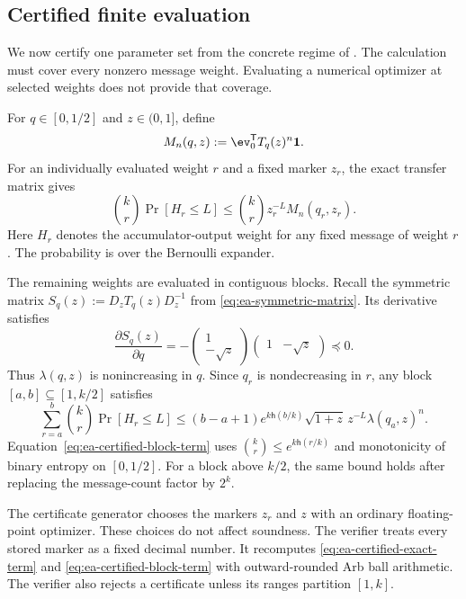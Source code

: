 \subsection{Certified finite evaluation}
\label{sec:ea-finite-certificate}

We now certify one parameter set from the concrete regime of \cite{EA}.  The
calculation must cover every nonzero message weight.  Evaluating a numerical
optimizer at selected weights does not provide that coverage.

For $q\in[0,1/2]$ and $z\in(0,1]$, define
\begin{equation}
 M_n(q,z):=\ev_0^{\mathsf T}T_q(z)^n\boldsymbol{1}.
 \label{eq:ea-exact-mgf}
\end{equation}
For an individually evaluated weight $r$ and a fixed marker $z_r$, the exact
transfer matrix gives
\begin{equation}
 \binom{k}{r}\Pr[H_r\leq L]
 \leq\binom{k}{r}z_r^{-L}M_n(q_r,z_r).
 \label{eq:ea-certified-exact-term}
\end{equation}
Here $H_r$ denotes the accumulator-output weight for any fixed message of
weight $r$.  The probability is over the Bernoulli expander.

The remaining weights are evaluated in contiguous blocks.  Recall the
symmetric matrix $S_q(z):=D_zT_q(z)D_z^{-1}$ from
\eqref{eq:ea-symmetric-matrix}.  Its derivative satisfies
\begin{equation}
 \frac{\partial S_q(z)}{\partial q}
 =-
 \begin{pmatrix}1\\-\sqrt z\end{pmatrix}
 \begin{pmatrix}1&-\sqrt z\end{pmatrix}
 \preceq0.
 \label{eq:ea-spectral-monotonicity}
\end{equation}
Thus $\lambda(q,z)$ is nonincreasing in $q$.  Since $q_r$ is nondecreasing in
$r$, any block $[a,b]\subseteq[1,k/2]$ satisfies
\begin{equation}
 \sum_{r=a}^{b}\binom{k}{r}\Pr[H_r\leq L]
 \leq
 (b-a+1)e^{k\mathsf{h}(b/k)}
 \sqrt{1+z}\,z^{-L}\lambda(q_a,z)^n.
 \label{eq:ea-certified-block-term}
\end{equation}
Equation~\eqref{eq:ea-certified-block-term} uses
$\binom{k}{r}\leq e^{k\mathsf{h}(r/k)}$ and monotonicity of binary entropy on
$[0,1/2]$.  For a block above $k/2$, the same bound holds after replacing the
message-count factor by $2^k$.

The certificate generator chooses the markers $z_r$ and $z$ with an ordinary
floating-point optimizer.  These choices do not affect soundness.  The
verifier treats every stored marker as a fixed decimal number.  It recomputes
\eqref{eq:ea-certified-exact-term} and
\eqref{eq:ea-certified-block-term} with outward-rounded Arb ball arithmetic.
The verifier also rejects a certificate unless its ranges partition
$[1,k]$.

